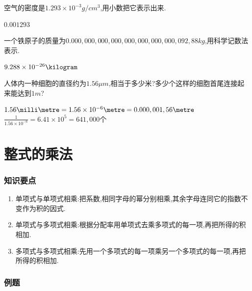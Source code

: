 \documentclass[cn,blue,12pt]{elegantbook}
\begin{document}
\begin{xiti}[resume]
\begin{xiti}
    \end{xiti}
\item 空气的密度是\(1.293 \times 10^{-3}g/cm^3\),用小数把它表示出来.
\begin{solution}
        \(0.001293\) \gram\per\cubic{\centi\metre}\\
\end{solution}
\item 一个铁原子的质量为\(0.000,000,000,000,000,000,000,000,092,88kg\),用科学记数法表示.
\begin{solution}
        \(9.288 \times 10^{-26} \kilogram \)\\
\end{solution}
\item 人体内一种细胞的直径约为\(1.56 \mu m\),相当于多少米?多少个这样的细胞首尾连接起来能达到\(1m\)?
\begin{solution}
        \(1.56 \milli\metre = 1.56 \times 10^{-6} \metre = 0.000,001,56 \metre \)\\
        \(\frac{1}{1.56 \times  10^{-6}}= 6.41 \times 10^5 = 641,000\)个
\end{solution}
\end{xiti}

\section{整式的乘法}%
\label{sec:整式的乘法}

\subsubsection{知识要点}%
\label{ssub:知识要点}
\begin{enumerate}
    \item 单项式与单项式相乘:把系数,相同字母的幂分别相乘,其余字母连同它的指数不变作为积的因式.
    \item 单项式与多项式相乘:根据分配率用单项式去乘多项式的每一项,再把所得的积相加.
    \item 多项式与多项式相乘:先用一个多项式的每一项乘另一个多项式的每一项,再把所得的积相加.
\end{enumerate}

\subsubsection{例题}%
\label{ssub:例题}
\end{document}
